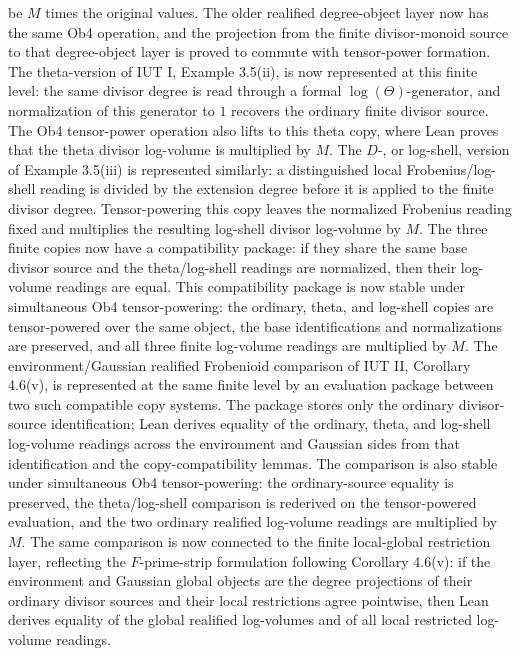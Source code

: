 \documentclass[11pt]{article}
\newcommand{\IUT}{IUT}
\newcommand{\Lean}{Lean}
\theoremstyle{plain}
\theoremstyle{definition}
\theoremstyle{remark}
\begin{document}
be \(M\) times the original values.  The older realified degree-object layer
now has the same Ob4 operation, and the projection from the finite
divisor-monoid source to that degree-object layer is proved to commute with
tensor-power formation.
The theta-version of \IUT{} I, Example 3.5(ii), is now represented at this
finite level: the same divisor degree is read through a formal
\(\log(\Theta)\)-generator, and normalization of this generator to \(1\)
recovers the ordinary finite divisor source.  The Ob4 tensor-power operation
also lifts to this theta copy, where \Lean{} proves that the theta divisor
log-volume is multiplied by \(M\).
The \(D\)-, or log-shell, version of Example 3.5(iii) is represented similarly:
a distinguished local Frobenius/log-shell reading is divided by the extension
degree before it is applied to the finite divisor degree.  Tensor-powering this
copy leaves the normalized Frobenius reading fixed and multiplies the resulting
log-shell divisor log-volume by \(M\).
The three finite copies now have a compatibility package: if they share the
same base divisor source and the theta/log-shell readings are normalized, then
their log-volume readings are equal.  This compatibility package is now stable
under simultaneous Ob4 tensor-powering: the ordinary, theta, and log-shell
copies are tensor-powered over the same object, the base identifications and
normalizations are preserved, and all three finite log-volume readings are
multiplied by \(M\).  The environment/Gaussian realified
Frobenioid comparison of \IUT{} II, Corollary 4.6(v), is represented at the
same finite level by an evaluation package between two such compatible copy
systems.  The package stores only the ordinary divisor-source identification;
\Lean{} derives equality of the ordinary, theta, and log-shell log-volume
readings across the environment and Gaussian sides from that identification
and the copy-compatibility lemmas.  The comparison is also stable under
simultaneous Ob4 tensor-powering: the ordinary-source equality is preserved,
the theta/log-shell comparison is rederived on the tensor-powered evaluation,
and the two ordinary realified log-volume readings are multiplied by \(M\).
The same comparison is now connected to
the finite local-global restriction layer, reflecting the \(F\)-prime-strip
formulation following Corollary 4.6(v): if the environment and Gaussian global
objects are the degree projections of their ordinary divisor sources and their
local restrictions agree pointwise, then \Lean{} derives equality of the
global realified log-volumes and of all local restricted log-volume readings.
\end{document}
